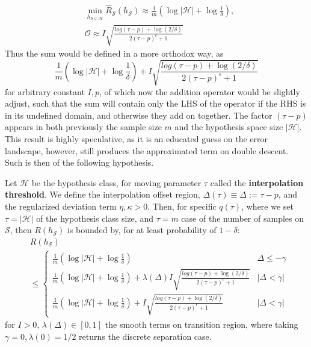 \documentclass[
  journal=largetwo,
  year=2025,
  volume=37,
]{cup-journal}
\begin{document}
\begin{align}
    &\min_{h_{\mathcal{S}\in\mathcal{H}}}\hat{R}_{\mathcal{S}}(h_{\mathcal{S}}) \approx \frac{1}{m} \left( \log{|\mathcal{H}|} + \log{\frac{1}{\delta}} \right),\\
    & \mathcal{O} \approx I \sqrt{\frac{log{(\tau - p)+\log{(2/\delta)}}}{2(\tau-p)^{\epsilon}+1}}
\end{align}
Thus the sum would be defined in a more orthodox way, as 
\begin{equation}
   \frac{1}{m} \left( \log{|\mathcal{H}|} + \log{\frac{1}{\delta}} \right) + I \sqrt{\frac{log{(\tau - p)+\log{(2/\delta)}}}{2(\tau-p)^{\epsilon}+1}}
\end{equation}
for arbitrary constant $I,p$, of which now the addition operator would be slightly adjust, such that the sum will contain only the LHS of the operator if the RHS is in its undefined domain, and otherwise they add on together. The factor $(\tau-p)$ appears in both previously the sample size $m$ and the hypothesis space size $|\mathcal{H}|$. This result is highly speculative, as it is an educated guess on the error landscape, however, still produces the approximated term on double descent. Such is then of the following hypothesis. 

\begin{hypothesis}\label{hyp:interpolation_tau}
    Let $\mathcal{H}$ be the hypothesis class, for moving parameter $\tau$ called the \textbf{interpolation threshold}. We define the interpolation offset region, $\Delta(\tau)\equiv\Delta := \tau-p$, and the regularized deviation term $\eta,\kappa>0$. Then, for specific $q(\tau)$, where we set $\tau=|\mathcal{H}|$ of the hypothesis class size, and $\tau=m$ case of the number of samples on $\mathcal{S}$, then $R(h_{\mathcal{S}})$ is bounded by, for at least probability of $1-\delta$: 
    \begin{equation}
        \begin{split}
            & R(h_{\mathcal{S}})\\
            &\leq \begin{cases}
            \frac{1}{m} \left( \log{|\mathcal{H}|} + \log{\frac{1}{\delta}} \right) & \Delta \leq -\gamma \\
            \frac{1}{m} \left( \log{|\mathcal{H}|} + \log{\frac{1}{\delta}} \right) + \lambda(\Delta) I \sqrt{\frac{log{(\tau - p)+\log{(2/\delta)}}}{2(\tau-p)^{\epsilon}+1}} & |\Delta <\gamma| \\
            \frac{1}{m} \left( \log{|\mathcal{H}|} + \log{\frac{1}{\delta}} \right) + I\sqrt{\frac{log{(\tau - p)+\log{(2/\delta)}}}{2(\tau-p)^{\epsilon}+1}} & |\Delta <\gamma| 
        \end{cases}
        \end{split}
    \end{equation}
    for $I>0$, $\lambda(\Delta)\in[0,1]$ the smooth terms on transition region, where taking $\gamma =0, \lambda(0)=1/2$ returns the discrete separation case. 
\end{hypothesis}
\end{document}
